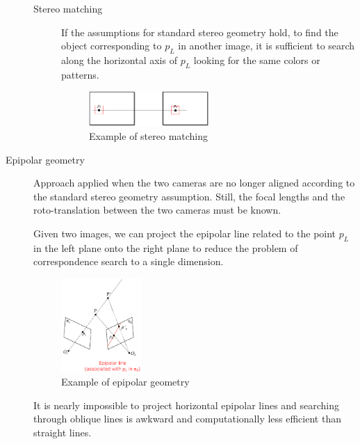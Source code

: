 \begin{description}
        \begin{description}
            \item[Stereo matching] 
                If the assumptions for standard stereo geometry hold,
                to find the object corresponding to $p_L$ in another image, 
                it is sufficient to search along the horizontal axis of $p_L$ looking for the same colors or patterns.

                \begin{figure}[H]
                    \centering
                    \includegraphics[width=0.5\textwidth]{./img/stereo_matching.png}
                    \caption{Example of stereo matching}
                \end{figure}
        \end{description}

    \item[Epipolar geometry] 
        Approach applied when the two cameras are no longer aligned according to the standard stereo geometry assumption.
        Still, the focal lengths and the roto-translation between the two cameras must be known.

        Given two images, we can project the epipolar line related to the point $p_L$ in the left plane onto the right plane
        to reduce the problem of correspondence search to a single dimension.

        \begin{figure}[H]
            \centering
            \includegraphics[width=0.3\textwidth]{./img/_epipolar_geometry.pdf}
            \caption{Example of epipolar geometry}
        \end{figure}

        \begin{remark}
            It is nearly impossible to project horizontal epipolar lines and 
            searching through oblique lines is awkward and computationally less efficient than straight lines.
        \end{remark}


\end{description}
